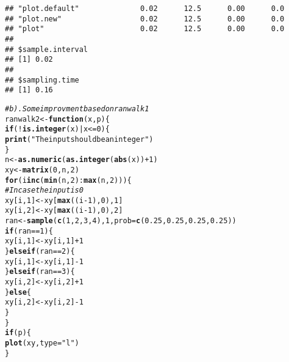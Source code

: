 \documentclass{article}\usepackage[]{graphicx}\usepackage[]{color}
\makeatletter
\newcommand{\hlnum}[1]{\textcolor[rgb]{0.686,0.059,0.569}{#1}}%
\newcommand{\hlstr}[1]{\textcolor[rgb]{0.192,0.494,0.8}{#1}}%
\newcommand{\hlcom}[1]{\textcolor[rgb]{0.678,0.584,0.686}{\textit{#1}}}%
\newcommand{\hlopt}[1]{\textcolor[rgb]{0,0,0}{#1}}%
\newcommand{\hlstd}[1]{\textcolor[rgb]{0.345,0.345,0.345}{#1}}%
\newcommand{\hlkwa}[1]{\textcolor[rgb]{0.161,0.373,0.58}{\textbf{#1}}}%
\newcommand{\hlkwb}[1]{\textcolor[rgb]{0.69,0.353,0.396}{#1}}%
\newcommand{\hlkwc}[1]{\textcolor[rgb]{0.333,0.667,0.333}{#1}}%
\newcommand{\hlkwd}[1]{\textcolor[rgb]{0.737,0.353,0.396}{\textbf{#1}}}%
\newenvironment{kframe}{%
 \def\at@end@of@kframe{}%
 \ifinner\ifhmode%
  \def\at@end@of@kframe{\end{minipage}}%
  \begin{minipage}{\columnwidth}%
 \fi\fi%
 \def\FrameCommand##1{\hskip\@totalleftmargin \hskip-\fboxsep
 \colorbox{shadecolor}{##1}\hskip-\fboxsep
     \hskip-\linewidth \hskip-\@totalleftmargin \hskip\columnwidth}%
 \MakeFramed {\advance\hsize-\width
   \@totalleftmargin\z@ \linewidth\hsize
   \@setminipage}}%
 {\par\unskip\endMakeFramed%
 \at@end@of@kframe}
\newenvironment{knitrout}{}{} %
\makeatother
\begin{document}
\begin{knitrout}
\begin{kframe}
\begin{verbatim}
## "plot.default"              0.02      12.5      0.00      0.0
## "plot.new"                  0.02      12.5      0.00      0.0
## "plot"                      0.02      12.5      0.00      0.0
## 
## $sample.interval
## [1] 0.02
## 
## $sampling.time
## [1] 0.16
\end{verbatim}
\begin{alltt}
\hlcom{# b). Some improvment based on ranwalk1}
\hlstd{ranwalk2} \hlkwb{<-} \hlkwa{function}\hlstd{(}\hlkwc{x}\hlstd{,} \hlkwc{p}\hlstd{) \{}
    \hlkwa{if} \hlstd{(}\hlopt{!}\hlkwd{is.integer}\hlstd{(x)} \hlopt{|} \hlstd{x} \hlopt{<=} \hlnum{0}\hlstd{) \{}
        \hlkwd{print}\hlstd{(}\hlstr{"The input should be an integer"}\hlstd{)}
    \hlstd{\}}
    \hlstd{n} \hlkwb{<-} \hlkwd{as.numeric}\hlstd{(}\hlkwd{as.integer}\hlstd{(}\hlkwd{abs}\hlstd{(x))} \hlopt{+} \hlnum{1}\hlstd{)}
    \hlstd{xy} \hlkwb{<-} \hlkwd{matrix}\hlstd{(}\hlnum{0}\hlstd{, n,} \hlnum{2}\hlstd{)}
    \hlkwa{for} \hlstd{(i} \hlkwa{in} \hlkwd{c}\hlstd{(}\hlkwd{min}\hlstd{(n,} \hlnum{2}\hlstd{)}\hlopt{:}\hlkwd{max}\hlstd{(n,} \hlnum{2}\hlstd{))) \{}
        \hlcom{# In case the input is 0}
        \hlstd{xy[i,} \hlnum{1}\hlstd{]} \hlkwb{<-} \hlstd{xy[}\hlkwd{max}\hlstd{((i} \hlopt{-} \hlnum{1}\hlstd{),} \hlnum{0}\hlstd{),} \hlnum{1}\hlstd{]}
        \hlstd{xy[i,} \hlnum{2}\hlstd{]} \hlkwb{<-} \hlstd{xy[}\hlkwd{max}\hlstd{((i} \hlopt{-} \hlnum{1}\hlstd{),} \hlnum{0}\hlstd{),} \hlnum{2}\hlstd{]}
        \hlstd{ran} \hlkwb{<-} \hlkwd{sample}\hlstd{(}\hlkwd{c}\hlstd{(}\hlnum{1}\hlstd{,} \hlnum{2}\hlstd{,} \hlnum{3}\hlstd{,} \hlnum{4}\hlstd{),} \hlnum{1}\hlstd{,} \hlkwc{prob} \hlstd{=} \hlkwd{c}\hlstd{(}\hlnum{0.25}\hlstd{,} \hlnum{0.25}\hlstd{,} \hlnum{0.25}\hlstd{,} \hlnum{0.25}\hlstd{))}
        \hlkwa{if} \hlstd{(ran} \hlopt{==} \hlnum{1}\hlstd{) \{}
            \hlstd{xy[i,} \hlnum{1}\hlstd{]} \hlkwb{<-} \hlstd{xy[i,} \hlnum{1}\hlstd{]} \hlopt{+} \hlnum{1}
        \hlstd{\}} \hlkwa{else if} \hlstd{(ran} \hlopt{==} \hlnum{2}\hlstd{) \{}
            \hlstd{xy[i,} \hlnum{1}\hlstd{]} \hlkwb{<-} \hlstd{xy[i,} \hlnum{1}\hlstd{]} \hlopt{-} \hlnum{1}
        \hlstd{\}} \hlkwa{else if} \hlstd{(ran} \hlopt{==} \hlnum{3}\hlstd{) \{}
            \hlstd{xy[i,} \hlnum{2}\hlstd{]} \hlkwb{<-} \hlstd{xy[i,} \hlnum{2}\hlstd{]} \hlopt{+} \hlnum{1}
        \hlstd{\}} \hlkwa{else} \hlstd{\{}
            \hlstd{xy[i,} \hlnum{2}\hlstd{]} \hlkwb{<-} \hlstd{xy[i,} \hlnum{2}\hlstd{]} \hlopt{-} \hlnum{1}
        \hlstd{\}}
    \hlstd{\}}
    \hlkwa{if} \hlstd{(p) \{}
        \hlkwd{plot}\hlstd{(xy,} \hlkwc{type} \hlstd{=} \hlstr{"l"}\hlstd{)}
    \hlstd{\}}

\end{alltt}
\end{kframe}
\end{knitrout}
\end{document}
